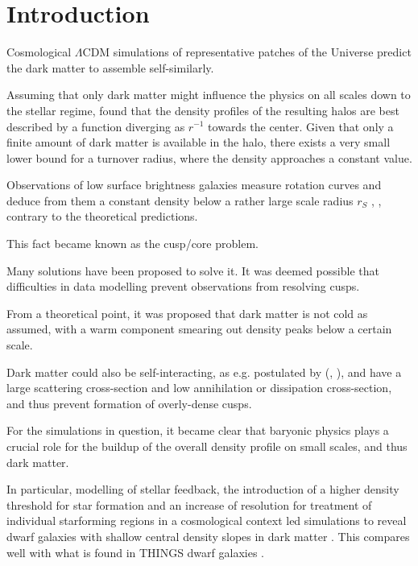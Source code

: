
\section{Introduction}\label{sec:introduction}


Cosmological $\Lambda$CDM simulations of representative patches of the
Universe predict the dark matter to assemble self-similarly.

Assuming that only dark matter might influence the physics on all
scales down to the stellar regime, \citet{Navarro+1997} found that the
density profiles of the resulting halos are best described by a
function diverging as $r^{-1}$ towards the center. Given that only a
finite amount of dark matter is available in the halo, there exists a
very small lower bound for a turnover radius, where the density
approaches a constant value.

Observations of low surface brightness galaxies measure rotation
curves and deduce from them a constant density below a rather large
scale radius $r_S$ , , contrary to
the theoretical predictions.

This fact became known as the cusp/core problem.



Many solutions have been proposed to solve it. It was deemed possible
that difficulties in data modelling prevent observations from
resolving cusps.


From a theoretical point, it was proposed that dark matter is not cold
as assumed, with a warm component smearing out density peaks below a
certain scale.

Dark matter could also be self-interacting, as e.g. postulated by
(\citet{SpergelSteinhardt2000}, \citet{Vogelsberger+2012}), and have a
large scattering cross-section and low annihilation or dissipation
cross-section, and thus prevent formation of overly-dense cusps.


For the simulations in question, it became clear that baryonic physics
plays a crucial role for the buildup of the overall density profile on
small scales, and thus dark matter.

In particular, modelling of stellar feedback, the introduction of a
higher density threshold for star formation and an increase of
resolution for treatment of individual starforming regions in a
cosmological context led simulations to reveal dwarf galaxies with
shallow central density slopes in dark matter
. This compares well with what is found in
THINGS dwarf galaxies .



